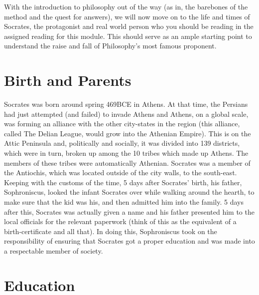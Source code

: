 With the introduction to philosophy out of the way (as in, the barebones of the method and the quest for answers), we will now move on to the life and times of Socrates, the protagonist and real world person who you should be reading in the assigned reading for this module. This should serve as an ample starting point to understand the raise and fall of Philosophy's most famous proponent.
\section{Birth and Parents}

Socrates was born around spring 469BCE in Athens. At that time, the Persians had just attempted  (and failed) to invade Athens and Athens, on a global scale, was forming an alliance with the other city-states in the region (this alliance, called The Delian League, would grow into the Athenian Empire). This is on the Attic Peninsula and, politically and socially, it was divided into 139 districts, which were in turn, broken up among the 10 tribes which made up Athens. The members of these tribes were automatically Athenian. Socrates was a member of the Antiochis, which was located outside of the city walls, to the south-east. Keeping with the customs of the time, 5 days after Socrates' birth, his father, Sophroniscus, looked the infant Socrates over while walking around the hearth, to make sure that the kid was his, and then admitted him into the family. 5 days after this, Socrates was actually given a name and his father presented him to the local officials for the relevant paperwork (think of this as the equivalent of a birth-certificate and all that). In doing this, Sophroniscus took on the responsibility of ensuring that Socrates got a proper education and was made into a respectable member of society.
\section{Education}


